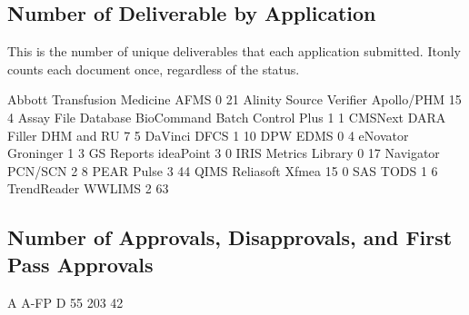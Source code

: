 \documentclass{article}
\begin{document}
\subsection{Number of Deliverable by Application}
This is the number of unique deliverables that each application submitted. Itonly counts
each document once, regardless of the status.
\begin{Schunk}
\begin{Soutput}
  Abbott Transfusion Medicine                          AFMS 
                            0                            21 
      Alinity Source Verifier                    Apollo/PHM 
                           15                             4 
          Assay File Database BioCommand Batch Control Plus 
                            1                             1 
                      CMSNext        DARA Filler DHM and RU 
                            7                             5 
                      DaVinci                          DFCS 
                            1                            10 
                          DPW                          EDMS 
                            0                             4 
                     eNovator                     Groninger 
                            1                             3 
                   GS Reports                     ideaPoint 
                            3                             0 
                         IRIS               Metrics Library 
                            0                            17 
                    Navigator                       PCN/SCN 
                            2                             8 
                         PEAR                         Pulse 
                            3                            44 
                         QIMS               Reliasoft Xfmea 
                           15                             0 
                          SAS                          TODS 
                            1                             6 
                  TrendReader                        WWLIMS 
                            2                            63 
\end{Soutput}
\end{Schunk}

\subsection{Number of Approvals, Disapprovals, and First Pass Approvals}

\begin{Schunk}
\begin{Soutput}
   A A-FP    D 
  55  203   42 
\end{Soutput}
\end{Schunk}
\end{document}
